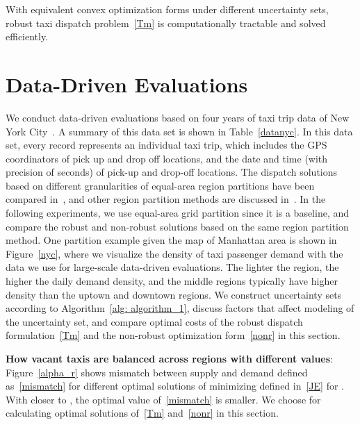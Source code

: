 \documentclass[10pt,twocolumn,twoside,english]{IEEEtran}
\begin{document}
With equivalent convex optimization forms under different uncertainty sets, robust taxi dispatch problem~\eqref{Tm} is computationally tractable and solved efficiently.

\section{Data-Driven Evaluations}
\label{sec:simulation}

We conduct data-driven evaluations based on four years of taxi trip data of New York City~\cite{Dan_nyc}. A summary of this data set is shown in Table~\ref{datanyc}. In this data set, every record represents an individual taxi trip, which includes the GPS coordinators of pick up and drop off locations, and the date and time (with precision of seconds) of pick-up and drop-off locations. The dispatch solutions based on different granularities of equal-area region partitions have been compared in~\cite{Miao_tase16}, and other region partition methods are discussed in~\cite{Miao2017}. In the following experiments, we use equal-area grid partition since it is a baseline, and compare the robust and non-robust solutions based on the same region partition method. One partition example given the map of Manhattan area is shown in Figure~\ref{nyc}, where we visualize the density of taxi passenger demand with the data we use for large-scale data-driven evaluations. The lighter the region, the higher the daily demand density, and the middle regions typically have higher density than the uptown and downtown regions. We construct uncertainty sets according to Algorithm~\ref{alg: algorithm_1}, discuss factors that affect modeling of the uncertainty set, and compare optimal costs of the robust dispatch formulation~\eqref{Tm} and the non-robust optimization form~\eqref{nonr} in this section.   

\textbf{How vacant taxis are balanced across regions with different  values}: Figure~\ref{alpha_r} shows mismatch between supply and demand defined as~\eqref{mismatch} for different optimal solutions of minimizing  defined in~\eqref{JE} for . With  closer to , the optimal value of~\eqref{mismatch} is smaller. We choose  for calculating optimal solutions of~\eqref{Tm} and~\eqref{nonr} in this section.
\end{document}
